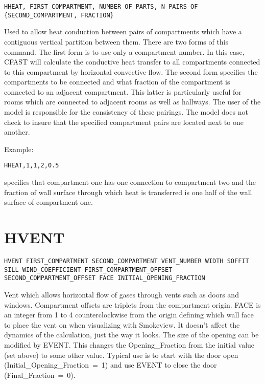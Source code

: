 \begin{lstlisting}
HHEAT, FIRST_COMPARTMENT, NUMBER_OF_PARTS, N PAIRS OF {SECOND_COMPARTMENT, FRACTION}
\end{lstlisting}

Used to allow heat conduction between pairs of compartments which have a contiguous vertical partition between them.  There are two forms of this command. The first form is to use only a compartment number. In this case, CFAST will calculate the conductive heat transfer to all compartments connected to this compartment by horizontal convective flow. The second form specifies the compartments to be connected and what fraction of the compartment is connected to an adjacent compartment. This latter is particularly useful for rooms which are connected to adjacent rooms as well as hallways. The user of the model is responsible for the consistency of these pairings.  The model does not check to insure that the specified compartment pairs are located next to one another.

Example:

\begin{lstlisting}
HHEAT,1,1,2,0.5
\end{lstlisting}
specifies that compartment one has one connection to compartment two and the fraction of wall surface through which heat is transferred is one half of the wall surface of compartment one.

\section{HVENT}

\begin{lstlisting}
HVENT FIRST_COMPARTMENT SECOND_COMPARTMENT VENT_NUMBER WIDTH SOFFIT SILL WIND_COEFFICIENT FIRST_COMPARTMENT_OFFSET SECOND_COMPARTMENT_OFFSET FACE INITIAL_OPENING_FRACTION
\end{lstlisting}

Vent which allows horizontal flow of gases through vents such as doors and windows. Compartment offsets are triplets from the compartment origin.  FACE is an integer from 1 to 4 counterclockwise from the origin defining which wall face to place the vent on when visualizing with Smokeview. It doesn't affect the dynamics of the calculation, just the way it looks. The size of the opening can be modified by EVENT. This changes the Opening\_Fraction from the initial value (set above) to some other value. Typical use is to start with the door open (Initial\_Opening\_Fraction~=~1) and use EVENT to close the door (Final\_Fraction~=~0).

